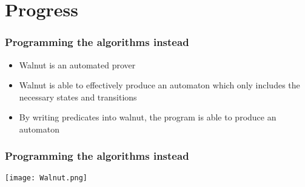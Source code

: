 \documentclass[leqno,presentation]{beamer}
\begin{document}
\section{Progress}


\begin{frame}
  \frametitle{Programming the algorithms instead}
  \begin{itemize}
 \item{Walnut is an automated prover}
  \item {Walnut is able to effectively produce an automaton which only includes the necessary states and transitions}
  \item {By writing predicates into walnut, the program is able to produce an automaton}
  \end{itemize}
\end{frame}

\begin{frame}
  \frametitle{Programming the algorithms instead}
   \texttt{[image: Walnut.png]}
\end{frame}
\end{document}
